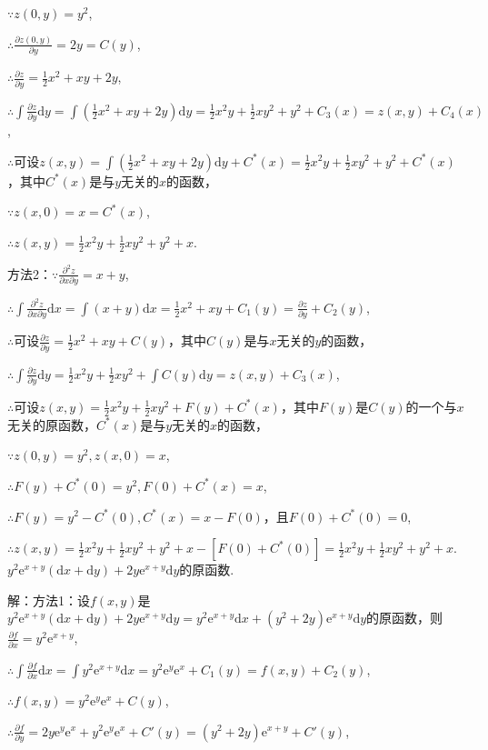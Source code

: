 \documentclass[12pt,UTF8]{ctexart}
\begin{document}
\begin{enumerate}
$\because z(0,y)=y^2$,

$\therefore\frac{\partial z(0,y)}{\partial y}=2y=C(y)$,

$\therefore\frac{\partial z}{\partial y}=\frac12x^2+xy+2y$,

$\therefore\int\frac{\partial z}{\partial y}\mathrm dy=\int(\frac12x^2+xy+2y)\mathrm dy=\frac12x^2y+\frac12xy^2+y^2+C_3(x)=z(x,y)+C_4(x)$,

$\therefore$可设$z(x,y)=\int(\frac12x^2+xy+2y)\mathrm dy+C^*(x)=\frac12x^2y+\frac12xy^2+y^2+C^*(x)$，其中$C^*(x)$是与$y$无关的$x$的函数，

$\because z(x,0)=x=C^*(x)$,

$\therefore z(x,y)=\frac12x^2y+\frac12xy^2+y^2+x$.

方法2：$\because\frac{\partial^2z}{\partial x\partial y}=x+y$,

$\therefore\int\frac{\partial^2z}{\partial x\partial y}\mathrm dx=\int(x+y)\mathrm dx=\frac12x^2+xy+C_1(y)=\frac{\partial z}{\partial y}+C_2(y)$,

$\therefore$可设$\frac{\partial z}{\partial y}=\frac12x^2+xy+C(y)$，其中$C(y)$是与$x$无关的$y$的函数，

$\therefore\int\frac{\partial z}{\partial y}\mathrm dy=\frac12x^2y+\frac12xy^2+\int C(y)\mathrm dy=z(x,y)+C_3(x)$,

$\therefore$可设$z(x,y)=\frac12x^2y+\frac12xy^2+F(y)+C^*(x)$，其中$F(y)$是$C(y)$的一个与$x$无关的原函数，$C^*(x)$是与$y$无关的$x$的函数，

$\because z(0,y)=y^2,z(x,0)=x$,

$\therefore F(y)+C^*(0)=y^2,F(0)+C^*(x)=x$,

$\therefore F(y)=y^2-C^*(0),C^*(x)=x-F(0)$，且$F(0)+C^*(0)=0$,

$\therefore z(x,y)=\frac12x^2y+\frac12xy^2+y^2+x-[F(0)+C^*(0)]=\frac12x^2y+\frac12xy^2+y^2+x$.
$y^2\mathrm e^{x+y}(\mathrm dx+\mathrm dy)+2y\mathrm e^{x+y}\mathrm dy$的原函数.

解：方法1：设$f(x,y)$是$y^2\mathrm e^{x+y}(\mathrm dx+\mathrm dy)+2y\mathrm e^{x+y}\mathrm dy=y^2\mathrm e^{x+y}\mathrm dx+(y^2+2y)\mathrm e^{x+y}\mathrm dy$的原函数，则$\frac{\partial f}{\partial x}=y^2\mathrm e^{x+y}$,

$\therefore\int\frac{\partial f}{\partial x}\mathrm dx=\int y^2\mathrm e^{x+y}\mathrm dx=y^2\mathrm e^y\mathrm e^x+C_1(y)=f(x,y)+C_2(y)$,

$\therefore f(x,y)=y^2\mathrm e^y\mathrm e^x+C(y)$,

$\therefore\frac{\partial f}{\partial y}=2y\mathrm e^y\mathrm e^x+y^2\mathrm e^y\mathrm e^x+C'(y)=(y^2+2y)\mathrm e^{x+y}+C'(y)$,


\end{enumerate}
\end{document}
